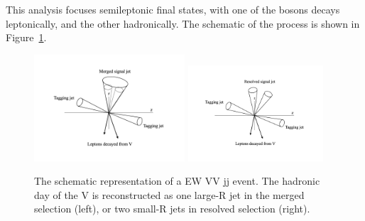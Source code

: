 
This analysis focuses semileptonic final states, with one of the bosons decays leptonically, and the other hadronically. 
The schematic of the process is shown in Figure~\ref{fig:VBStopology}.


\begin{figure}[H]
\begin{center}
 \includegraphics[width=0.50\textwidth,keepaspectratio]{figures/VBStopologyMerged}
 \includegraphics[width=0.45\textwidth,keepaspectratio]{figures/VBStopologyResolved}
\caption{
The schematic representation of a EW VV jj event. The hadronic day of the V is reconstructed as one large-R jet in the merged selection (left), or two small-R jets in resolved selection (right).
}
\label{fig:VBStopology}
\end{center}
\end{figure}

